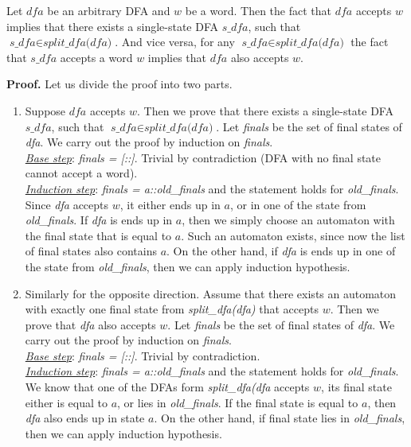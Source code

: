 \begin{theorem}
  Let $\textit{dfa}$ be an arbitrary DFA and $w$ be a word. Then the fact that $\textit{dfa}$ accepts $w$ implies that there exists a single-state DFA $\textit{s\_dfa}$, such that $\textit{s\_dfa} \in \textit{split\_dfa(dfa)}$. And vice versa, for any $\textit{s\_dfa} \in \textit{split\_dfa(dfa)}$ the fact that $\textit{s\_dfa}$ accepts a word $w$ implies that $\textit{dfa}$ also accepts $w$.
\end{theorem}

\textbf{Proof.}
Let us divide the proof into two parts.
\begin{enumerate}
\item Suppose $\textit{dfa}$ accepts $w$. Then we prove that there exists a single-state DFA $\textit{s\_dfa}$, such that $\textit{s\_dfa} \in \textit{split\_dfa(dfa)}$. 
Let \textit{finals} be the set of final states of \textit{dfa}. We carry out the proof by induction on \textit{finals}. 
\\
\textit{\underline{Base step}}: \textit{finals = [::]}. Trivial by contradiction (DFA with no final state cannot accept a word).
\\
\textit{\underline{Induction step}}: \textit{finals = a::old\_finals} and the statement holds for \textit{old\_finals}. Since \textit{dfa} accepts $w$, it either ends up in $a$, or in one of the state from \textit{old\_finals}.
If \textit{dfa} is ends up in $a$, then we simply choose an automaton with the final state that is equal to $a$.
Such an automaton exists, since now the list of final states also contains $a$.
On the other hand, if \textit{dfa} is ends up in one of the state from \textit{old\_finals}, then we can apply induction hypothesis.

\item Similarly for the opposite direction. Assume that there exists an automaton with exactly one final state from \textit{split\_dfa(dfa)} that accepts $w$. Then we prove that \textit{dfa} also accepts $w$. 
Let \textit{finals} be the set of final states of \textit{dfa}. We carry out the proof by induction on \textit{finals}. 
\\
\textit{\underline{Base step}}: \textit{finals = [::]}. Trivial by contradiction.
\\
\textit{\underline{Induction step}}: \textit{finals = a::old\_finals} and the statement holds for \textit{old\_finals}.
We know that one of the DFAs form \textit{split\_dfa(dfa} accepts $w$, its final state either is equal to $a$, or lies in \textit{old\_finals}.
If the final state is equal to $a$, then \textit{dfa} also ends up in state $a$.
On the other hand, if final state lies in \textit{old\_finals}, then we can apply induction hypothesis.
\end{enumerate}



